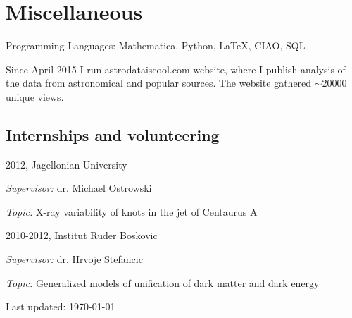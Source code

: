 \documentclass[11pt,letterpaper]{article}
\renewenvironment{itemize}{
  \begin{list}{}{
    \setlength{\leftmargin}{1.5em}
    \setlength{\itemsep}{0.15em}
    \setlength{\parskip}{0pt}
    \setlength{\parsep}{0.25em}
  }
}{
  \end{list}
}
\begin{document}
\section*{Miscellaneous}

\begin{itemize}
\item Programming Languages: Mathematica, Python, \LaTeX, CIAO, SQL

\item Since April 2015 I run astrodataiscool.com website, where I publish analysis of the data from astronomical and popular sources. The website gathered $\sim$20000 unique views. 
\end{itemize}
\subsection*{Internships and volunteering}
\begin{itemize}
  \item 2012, Jagellonian University
  \begin{itemize}
     
  
\item \textit{Supervisor:} dr. Michael Ostrowski
 \item  \textit{Topic:} X-ray variability of knots in the jet of Centaurus A
\end{itemize}  
  \item 2010-2012, Institut Ruder Boskovic
  \begin{itemize}
\item \textit{Supervisor:} dr. Hrvoje Stefancic
 \item  \textit{Topic:} Generalized models of unification of dark matter and dark energy
\end{itemize}  
\end{itemize}




\begin{center}

{\small Last updated: \today}

\end{center}
\end{document}
